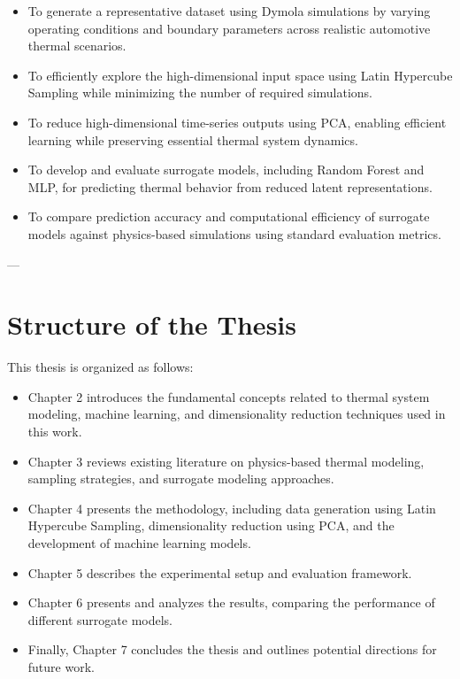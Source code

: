 \begin{itemize}
    \item To generate a representative dataset using Dymola simulations by varying operating conditions and boundary parameters across realistic automotive thermal scenarios.

    \item To efficiently explore the high-dimensional input space using Latin Hypercube Sampling while minimizing the number of required simulations.

    \item To reduce high-dimensional time-series outputs using PCA, enabling efficient learning while preserving essential thermal system dynamics.

    \item To develop and evaluate surrogate models, including Random Forest and MLP, for predicting thermal behavior from reduced latent representations.

    \item To compare prediction accuracy and computational efficiency of surrogate models against physics-based simulations using standard evaluation metrics.
\end{itemize}

---

\section{Structure of the Thesis}

This thesis is organized as follows:

\begin{itemize}
    \item Chapter 2 introduces the fundamental concepts related to thermal system modeling, machine learning, and dimensionality reduction techniques used in this work.
    \item Chapter 3 reviews existing literature on physics-based thermal modeling, sampling strategies, and surrogate modeling approaches.
    \item Chapter 4 presents the methodology, including data generation using Latin Hypercube Sampling, dimensionality reduction using PCA, and the development of machine learning models.
    \item Chapter 5 describes the experimental setup and evaluation framework.
    \item Chapter 6 presents and analyzes the results, comparing the performance of different surrogate models.
    \item Finally, Chapter 7 concludes the thesis and outlines potential directions for future work.
\end{itemize}


